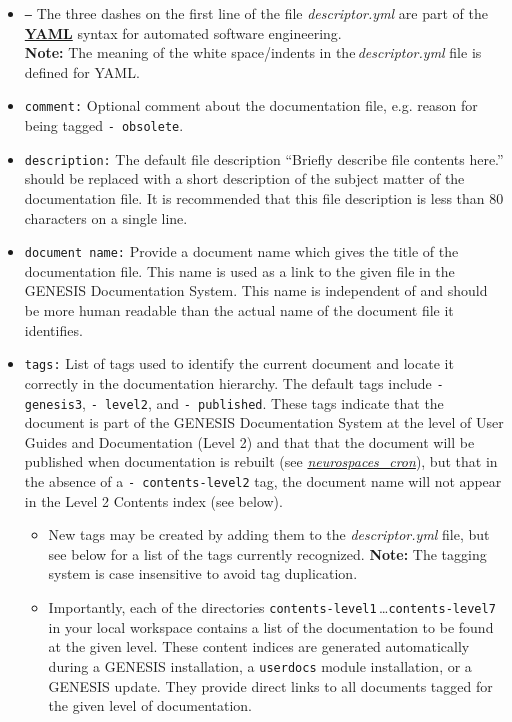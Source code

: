 \documentclass[12pt]{article}
\begin{document}
\begin{itemize}

\item[]{\tt ---} The three dashes on the first line of the file {\it descriptor.yml} are part of the \href{http://yaml.org}{\bf YAML} syntax for automated software engineering. \\
{\bf Note:} The meaning of the white space/indents in the\,{\it descriptor.yml} file is defined for YAML.

\item[]{\tt comment:} Optional comment about the documentation file, e.g. reason for being tagged {\tt -\,obsolete}.

\item[]{\tt description:} The default file description ``Briefly describe file contents here.'' should be replaced with a short description of the subject matter of the documentation file. It is recommended that this file description is less than 80 characters on a single line.

\item[]{\tt document\,name:} Provide a document name which gives the title of the documentation file. This name is used as a link to the given file in the GENESIS Documentation System. This name is independent of and should be more human readable than the actual name of the document file it identifies.

\item[]{\tt tags:} List of tags used to identify the current document and locate it correctly in the documentation hierarchy. The default tags include {\tt -\,genesis3}, {\tt -\,level2}, and {\tt -\,published}. These tags indicate that the document is part of the GENESIS Documentation System at the level of User Guides and Documentation (Level 2) and that that the document will be published when documentation is rebuilt (see \href{../neurospaces-cron/neurospaces-cron.tex}{\it neurospaces\_cron}), but that in the absence of a {\tt - contents-level2} tag, the document name will not appear in the Level 2 Contents index (see below).

\begin{itemize}
   \item New tags may be created by adding them to the {\it descriptor.yml} file, but see below for a list of the tags currently recognized.  {\bf Note:} The tagging system is case insensitive to avoid tag duplication.

   \item Importantly, each of the directories {\tt contents-level1}\,\ldots {\tt contents-level7} in your local workspace contains a list of the documentation to be found at the given level. These content indices are generated automatically during a GENESIS installation, a {\tt userdocs} module installation, or a GENESIS update. They provide direct links to all documents tagged for the given level of documentation.
\end{itemize}   
\end{itemize}
\end{document}
